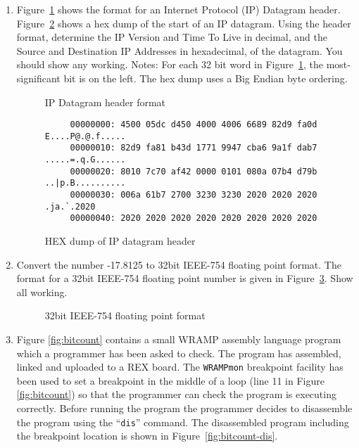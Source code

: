 \documentclass[a4paper,10pt]{article}
\begin{document}
\begin{enumerate}
\item Figure~\ref{fig:iphead} shows the format for an Internet Protocol
(IP) Datagram header. Figure~\ref{fig:iphex} shows a hex dump of the start
of an IP datagram. Using the header format, determine the IP Version and Time To Live in decimal, and
the Source and Destination IP Addresses in hexadecimal, of the datagram.
You should show any working. Notes: For each 32 bit word in
Figure~\ref{fig:iphead}, the most-significant bit is on the left. The hex dump uses a Big Endian byte ordering.

\vspace{-1cm}

\begin{figure}[h]
  \begin{center}
    \caption{IP Datagram header format}
    \label{fig:iphead}
  \end{center}
\end{figure}

\begin{figure}[h]
{\small
\begin{verbatim}
     00000000: 4500 05dc d450 4000 4006 6689 82d9 fa0d  E....P@.@.f.....
     00000010: 82d9 fa81 b43d 1771 9947 cba6 9a1f dab7  .....=.q.G......
     00000020: 8010 7c70 af42 0000 0101 080a 07b4 d79b  ..|p.B..........
     00000030: 006a 61b7 2700 3230 3230 2020 2020 2020  .ja.`.2020      
     00000040: 2020 2020 2020 2020 2020 2020 2020 2020  
\end{verbatim}
}
\caption{HEX dump of IP datagram header}
\label{fig:iphex}
\end{figure}

\newpage
\item Convert the number -17.8125 to 32bit IEEE-754 floating point
format. The format for a 32bit IEEE-754 floating point number is given
in Figure~\ref{fig:float}. Show all working.

\begin{figure}[h]
  \begin{center}
    \caption{32bit IEEE-754 floating point format}
    \label{fig:float}
  \end{center}
\end{figure}

\item Figure \ref{fig:bitcount} contains a small WRAMP assembly language
program which a programmer has been asked to check. The program has
assembled, linked and uploaded to a REX board. The
 \texttt{WRAMPmon} breakpoint facility has been used to set
a breakpoint in the middle of a loop (line 11 in Figure
\ref{fig:bitcount}) so that the programmer can check the program is executing
correctly. Before running the program the programmer decides to
disassemble the program using the ``\texttt{dis}'' command. The
disassembled program including the breakpoint location is shown in
Figure~\ref{fig:bitcount-dis}.


\end{enumerate}
\end{document}
